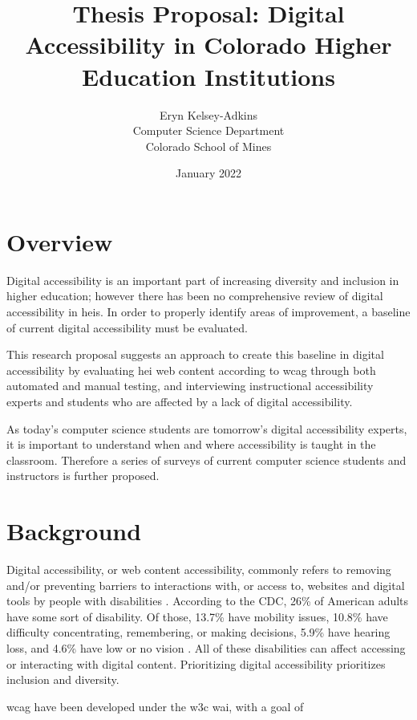 \documentclass{article}
\title{Thesis Proposal: Digital Accessibility in Colorado Higher Education Institutions}
\author{Eryn Kelsey-Adkins\\Computer Science Department\\Colorado School of Mines}
\date{January 2022}
\begin{document}
\maketitle

\tableofcontents

\section{Overview}

Digital accessibility is an important part of increasing diversity and inclusion in higher education; however there has been no comprehensive review of digital accessibility in \acrfull{heis}. In order to properly identify areas of improvement, a baseline of current digital accessibility must be evaluated. 

This research proposal suggests an approach to create this baseline in digital accessibility by evaluating \acrshort{hei} web content according to \acrfull{wcag} through both automated and manual testing, and interviewing instructional accessibility experts and students who are affected by a lack of digital accessibility.

As today's computer science students are tomorrow's digital accessibility experts, it is important to understand when and where accessibility is taught in the classroom. Therefore a series of surveys of current computer science students and instructors is further proposed.

\section{Background}

Digital accessibility, or web content accessibility, commonly refers to removing and/or preventing barriers to interactions with, or access to, websites and digital tools by people with disabilities \cite{george}. According to the CDC, 26\% of American adults have some sort of disability. Of those, 13.7\% have mobility issues, 10.8\% have difficulty concentrating, remembering, or making decisions, 5.9\% have hearing loss, and 4.6\% have low or no vision \cite{cdc_disability_2019}. All of these disabilities can affect accessing or interacting with digital content. Prioritizing digital accessibility prioritizes inclusion and diversity.

\acrlong{wcag} have been developed under the \acrfull{w3c} \acrfull{wai}, with a goal of  \cite{wcag_intro}
\end{document}
